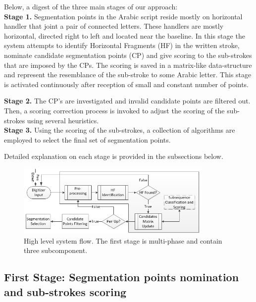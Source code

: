 \documentclass[journal,compsoc]{IEEEtran}
\begin{document}
Below, a digest of the three main stages of our approach: \\

\textbf{Stage 1.} Segmentation points in the Arabic script reside mostly on horizontal handler that joint a pair of connected letters. These handlers are mostly horizontal, directed right to left and located near the baseline. In this stage the system attempts to identify Horizontal Fragments (HF) in the written stroke, nominate candidate segmentation points (CP) and give scoring to the sub-strokes that are imposed by the CPs. The scoring is saved in a matrix-like data-structure and represent the resemblance of the sub-stroke to some Arabic letter. This stage is activated continuously after reception of small and constant number of points. 

\textbf{Stage 2.} The CP's are investigated and invalid candidate points are filtered out. Then, a scoring correction process is invoked to adjust the scoring of the sub-strokes using several heuristics.\\

\textbf{Stage 3.} Using the scoring of the sub-strokes, a collection of algorithms are employed to select the final set of segmentation points.

Detailed explanation on each stage is provided in the subsections below.

\begin{figure}
\centering
\includegraphics[width=9.5cm]{./figures/system_flow}
\caption{High level system flow. The first stage is multi-phase and contain three subcomponent. }
\label{fig:system_flow}
\end{figure}

\subsection{First Stage: Segmentation points nomination and sub-strokes scoring}
\end{document}
